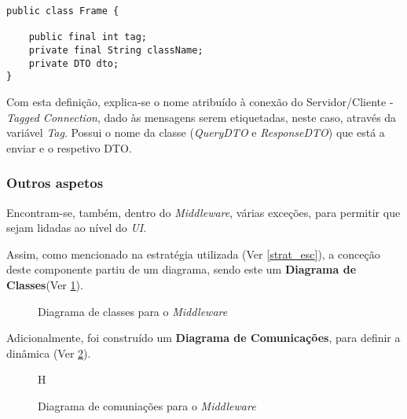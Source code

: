 \documentclass[relatorio.tex]{subfiles}
\begin{document}
\begin{verbatim}
public class Frame {

    public final int tag;
    private final String className;
    private DTO dto;
}
\end{verbatim}

Com esta definição, explica-se o nome atribuído à conexão do Servidor/Cliente - \textit{Tagged Connection}, dado às mensagens serem etiquetadas,
neste caso, através da variável \textit{Tag}.
Possui o nome da classe (\textit{QueryDTO} e \textit{ResponseDTO}) que está a enviar e o respetivo DTO.


\subsubsection{Outros aspetos}

Encontram-se, também, dentro do \textit{Middleware}, várias exceções, para permitir que sejam lidadas ao nível do \textit{UI}.

Assim, como mencionado na estratégia utilizada (Ver \ref{strat_esc}), a conceção deste componente partiu de um diagrama, 
sendo este um \textbf{Diagrama de Classes}(Ver \ref{dig:classes_middle}).

\begin{figure}[H] \label{dig:classes_middle}
    \caption{Diagrama de classes para o \textit{Middleware}}
\end{figure}

Adicionalmente, foi construído um \textbf{Diagrama de Comunicações}, para definir a dinâmica (Ver \ref{dig:comms_middle}).

\begin{figure}{H} \label{dig:comms_middle}
    \caption{Diagrama de comuniações para o \textit{Middleware}}
\end{figure}
\end{document}
